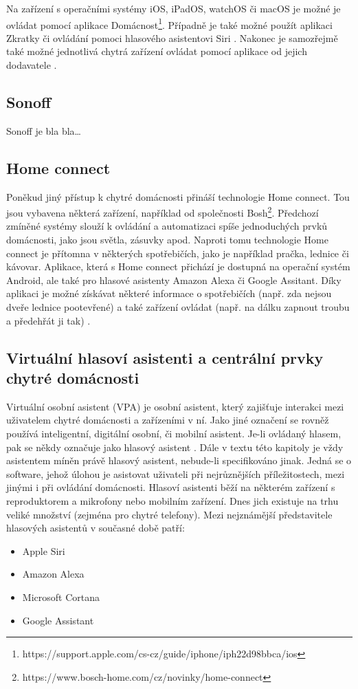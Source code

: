 Na zařízení s operačními systémy iOS, iPadOS, watchOS či macOS je možné je ovládat pomocí aplikace Domácnost\footnote{https://support.apple.com/cs-cz/guide/iphone/iph22d98bbca/ios}. Případně je také možné použít aplikaci Zkratky či ovládání pomoci hlasového asistentovi Siri \cite{StavimeChytrouDomacnostApple}. Nakonec je samozřejmě také možné jednotlivá chytrá zařízení ovládat pomocí aplikace od jejich dodavatele \cite{StavimeChytrouDomacnostApple2}.


\subsection*{Sonoff}
Sonoff je bla bla…


\subsection*{Home connect}
Poněkud jiný přístup k chytré domácnosti přináší technologie Home connect. Tou jsou vybavena některá zařízení, například od společnosti Bosh\footnote{https://www.bosch-home.com/cz/novinky/home-connect}. Předchozí zmíněné systémy slouží k ovládání a automatizaci spíše jednoduchých prvků domácnosti, jako jsou světla, zásuvky apod. Naproti tomu technologie Home connect je přítomna v některých spotřebičích, jako je například pračka, lednice či kávovar. Aplikace, která s Home connect přichází je dostupná na operační systém Android, ale také pro hlasové asistenty Amazon Alexa či Google Assitant. Díky aplikaci je možné získávat některé informace o spotřebičích (např. zda nejsou dveře lednice pootevřené) a také zařízení ovládat (např. na dálku zapnout troubu a předehřát ji tak) \cite{HomeConnect}.

\subsection*{Virtuální hlasoví asistenti a centrální prvky chytré domácnosti}
Virtuální osobní asistent (VPA) je osobní asistent, který zajišťuje interakci mezi uživatelem chytré domácnosti a zařízeními v ní. Jako jiné označení se rovněž používá inteligentní, digitální osobní, či mobilní asistent. Je-li ovládaný hlasem, pak se někdy označuje jako hlasový asistent \cite{TalkingToSmartDevices}. Dále v textu této kapitoly je vždy asistentem míněn právě hlasový asistent, nebude-li specifikováno jinak. Jedná se o software, jehož úlohou je asistovat uživateli při nejrůznějších příležitostech, mezi jinými i při ovládání domácnosti. Hlasoví asistenti běží na některém zařízení s reproduktorem a mikrofony nebo mobilním zařízení. Dnes jich existuje na trhu veliké množství (zejména pro chytré telefony). Mezi nejznámější představitele hlasových asistentů v současné době patří:
\begin{itemize}
\item Apple Siri
\item Amazon Alexa
\item Microsoft Cortana
\item Google Assistant \cite{VoiceAssistantsIntro}
\end{itemize}

